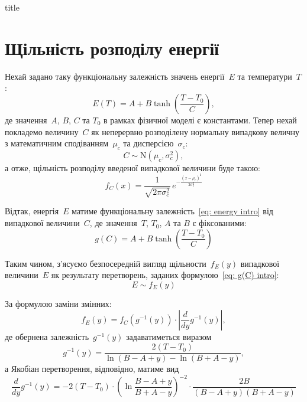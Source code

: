 \documentclass{mathreport}
\begin{document}

{title}

\tableofcontents

\newpage
\section{Щільність розподілу енергії}

\setcounter{subsection}{1}
\setcounter{equation}{0}

Нехай задано таку функціональну залежність значень енергії~$E$ та температури~$T$:
\begin{equation}\label{eq: energy intro}
    E(T) = A + B\tanh{\left( \frac{T-T_0}{C} \right)},
\end{equation}
де значення~$A$, $B$, $C$ та $T_0$ в рамках фізичної моделі є константами. Тепер нехай покладемо величину~$C$ як неперервно розподілену нормальну випадкову величну з математичним сподіванням~$\mu_c$ та дисперсією~$\sigma_c$:
\begin{equation}\label{eq: C coefficient distribution}
    C \sim \mathrm{N}(\mu_c,\sigma_c^2),
\end{equation}
а отже, щільність розподілу введеної випадкової величини буде такою:
\begin{equation}\label{eq: C explicit coefficient distribution}
    f_C(x) = \frac{1}{\sqrt{2\pi \sigma_c^2}}\, e^{-\frac{(x-\mu_c)^2}{2\sigma_c^2}}
\end{equation}

Відтак, енергія~$E$ матиме функціональну залежність~\eqref{eq: energy intro} від випадкової величини~$C$, де значення~$T$, $T_0$, $A$ та $B$ є фіксованими:
\begin{equation}\label{eq: g(C) intro}
    g(C) = A + B\tanh{\left( \frac{T-T_0}{C} \right)}
\end{equation}

Таким чином, з'ясуємо безпосередній вигляд щільности~$f_E(y)$ випадкової величини~$E$ як результату перетворень, заданих формулою~\eqref{eq: g(C) intro}:
\begin{equation}\label{eq: energy distribution intro}
    E \sim f_E(y)
\end{equation}

За формулою заміни змінних:
\begin{equation}\label{eq: сhange of variables formula}
    f_E(y) = f_C\left( g^{-1}(y) \right) \cdot \left| \frac{d}{dy}g^{-1}(y) \right|,
\end{equation}
де обернена залежність~$g^{-1}(y)$ задаватиметься виразом
\begin{equation}\label{eq: inverse g(y)}
    g^{-1}(y) = \frac{2(T-T_0)}{\ln{(B-A+y)} - \ln{(B+A-y)}},
\end{equation}
а Якобіан перетворення, відповідно, матиме вид
\begin{equation}\label{eq: Jacobian}
    \frac{d}{dy}g^{-1}(y) = -2(T-T_0) \cdot \left( \ln{\frac{B-A+y}{B+A-y}} \right)^{-2} \cdot \frac{2B}{(B-A+y)(B+A-y)}
\end{equation}
\end{document}
